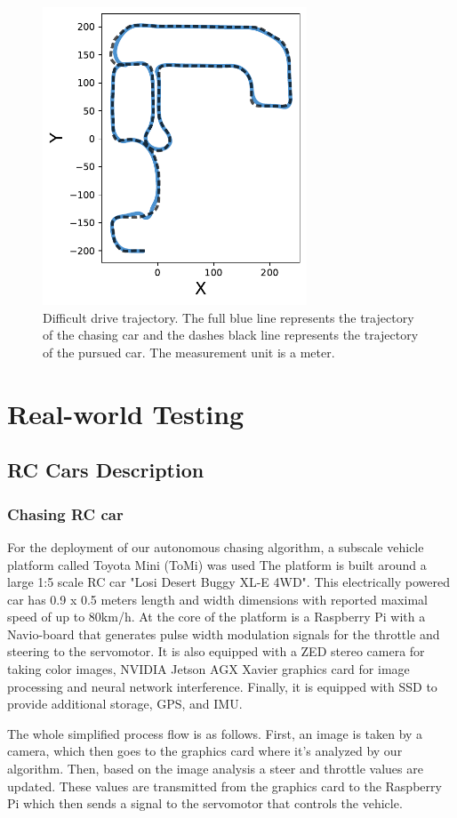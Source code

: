 \documentclass{ctuthesis/ctuthesis}
\begin{document}
\begin{figure}[]
    \centering
    \includegraphics[width=0.7\textwidth]{images/trajectory.pdf}
    
    \caption{Difficult drive trajectory. The full blue line represents the trajectory of the chasing car and the dashes black line represents the trajectory of the pursued car. The measurement unit is a meter. }\label{f:trajectory}
\end{figure}



\section{Real-world Testing}
\subsection{RC Cars Description}
\subsubsection{Chasing RC car}
For the deployment of our autonomous chasing algorithm, a subscale vehicle platform called Toyota Mini (ToMi) was used %
The platform is built around a large 1:5 scale RC car "Losi Desert Buggy XL-E 4WD". This electrically powered car has 0.9 x 0.5 meters length and width dimensions with reported maximal speed of up to 80km/h. At the core of the platform is a Raspberry Pi with a Navio-board that generates pulse width modulation signals for the throttle and steering to the servomotor. It is also equipped with a ZED stereo camera for taking color images, NVIDIA Jetson AGX Xavier graphics card for image processing and neural network interference. Finally, it is equipped with SSD to provide additional storage, GPS, and IMU. \par
The whole simplified process flow is as follows. First, an image is taken by a camera, which then goes to the graphics card where it's analyzed by our algorithm. Then, based on the image analysis a steer and throttle values are updated. These values are transmitted from the graphics card to the Raspberry Pi which then sends a signal to the servomotor that controls the vehicle.
\end{document}
